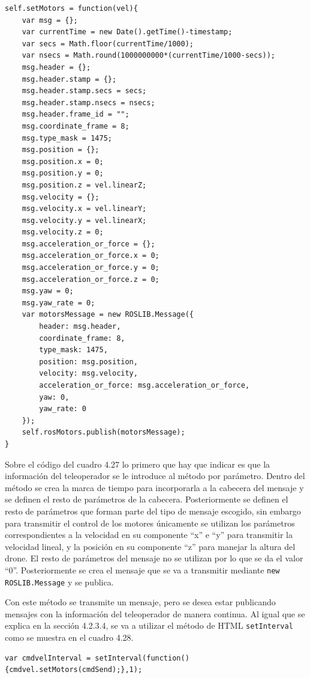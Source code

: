 \begin{lstlisting}[caption= Publicar el mensaje con la información del teleoperador, label=cod.publishetmotors]
self.setMotors = function(vel){
	var msg = {};
	var currentTime = new Date().getTime()-timestamp;
	var secs = Math.floor(currentTime/1000);
	var nsecs = Math.round(1000000000*(currentTime/1000-secs));
	msg.header = {};
	msg.header.stamp = {};
	msg.header.stamp.secs = secs;
	msg.header.stamp.nsecs = nsecs;
	msg.header.frame_id = "";
	msg.coordinate_frame = 8;
	msg.type_mask = 1475;
	msg.position = {};
	msg.position.x = 0;
	msg.position.y = 0;
	msg.position.z = vel.linearZ;
	msg.velocity = {};
	msg.velocity.x = vel.linearY;
	msg.velocity.y = vel.linearX;
	msg.velocity.z = 0;
	msg.acceleration_or_force = {};
	msg.acceleration_or_force.x = 0;
	msg.acceleration_or_force.y = 0;
	msg.acceleration_or_force.z = 0;
	msg.yaw = 0;
	msg.yaw_rate = 0;
	var motorsMessage = new ROSLIB.Message({
		header: msg.header,
		coordinate_frame: 8,
		type_mask: 1475,
		position: msg.position,
		velocity: msg.velocity,
		acceleration_or_force: msg.acceleration_or_force,
		yaw: 0,
		yaw_rate: 0
	});
	self.rosMotors.publish(motorsMessage);
}
\end{lstlisting}

Sobre el código del cuadro 4.27 lo primero que hay que indicar es que la información del teleoperador se le introduce al método por parámetro. Dentro del método se crea la marca de tiempo para incorporarla a la cabecera del mensaje y se definen el resto de parámetros de la cabecera. Posteriormente se definen el resto de parámetros que forman parte del tipo de mensaje escogido, sin embargo para transmitir el control de los motores únicamente se utilizan los parámetros correspondientes a la velocidad en su componente ``x'' e ``y'' para transmitir la velocidad lineal, y la posición en su componente ``z'' para manejar la altura del drone. El resto de parámetros del mensaje no se utilizan por lo que se da el valor ``0''. Posteriormente se crea el mensaje que se va a transmitir mediante \texttt{new ROSLIB.Message} y se publica.

Con este método se transmite un mensaje, pero se desea estar publicando mensajes con la información del teleoperador de manera continua. Al igual que se explica en la sección 4.2.3.4, se va a utilizar el método de HTML \texttt{setInterval} como se muestra en el cuadro 4.28.

\begin{lstlisting}[caption= Publicación continua del mensaje con la información del teleoperador, label=cod.intervalMotors]
var cmdvelInterval = setInterval(function(){cmdvel.setMotors(cmdSend);},1);
\end{lstlisting}

